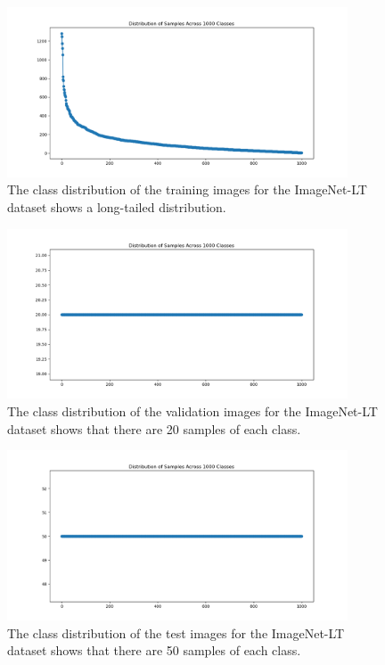 \begin{figure}[h!]
    \centering
    \includegraphics[width=0.9\textwidth]{Images/Plots/class_distribution_train.png}
    \caption{The class distribution of the training images for the ImageNet-LT dataset shows a long-tailed distribution.}
    \label{fig:IN-train}
\end{figure}

\begin{figure}[H]
    \centering
    \includegraphics[width=0.9\textwidth]{Images/Plots/class_distribution_val.png}
    \caption{The class distribution of the validation images for the ImageNet-LT dataset shows that there are 20 samples of each class.}
    \label{fig:IN-val}
\end{figure}

\begin{figure}[H]
    \centering
    \includegraphics[width=0.9\textwidth]{Images/Plots/class_distribution_test.png}
    \caption{The class distribution of the test images for the ImageNet-LT dataset shows that there are 50 samples of each class.}
    \label{fig:IN-test}
\end{figure}


